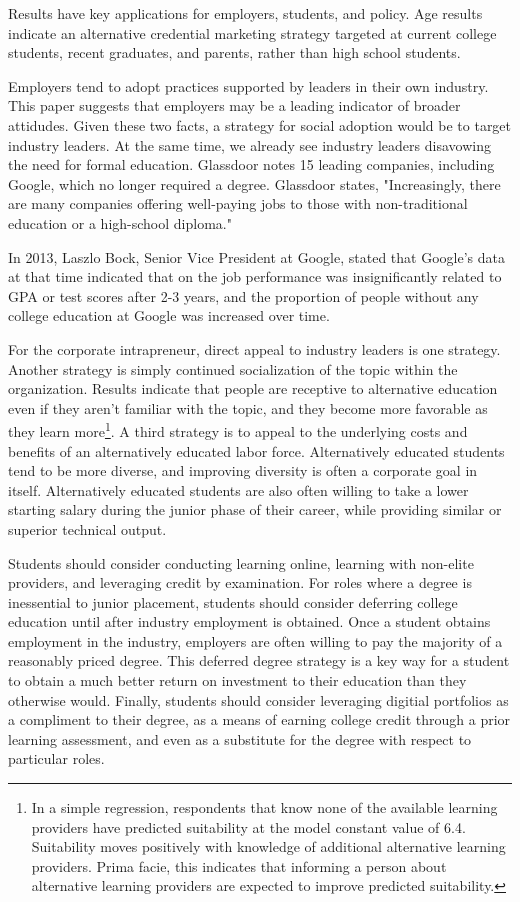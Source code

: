 \documentclass[AER]{./aea-latex-templates/AEA}
\begin{document}
Results have key applications for employers, students, and policy.
Age results indicate an alternative credential marketing strategy targeted at
current college students, recent graduates, and parents, rather than high school students.

Employers tend to adopt practices supported by leaders in their own industry.
This paper suggests that employers may be a leading indicator of broader attidudes.
Given these two facts, a strategy for social adoption would be to target industry leaders.
At the same time, we already see industry leaders disavowing the need for formal education.
Glassdoor notes 15 leading companies, including Google, which no longer required a degree\cite{glassdoor_2018}. Glassdoor
states, "Increasingly, there are many companies offering well-paying jobs
to those with non-traditional education or a high-school diploma."

In 2013, Laszlo Bock, Senior Vice President at Google, stated that Google’s data at that time indicated
that on the job performance was insignificantly related to GPA or test
scores after 2-3 years, and the proportion of people without any college
education at Google was increased over time\cite{bryant_2013}.

For the corporate intrapreneur, direct appeal to industry leaders is one strategy.
Another strategy is simply continued socialization of the topic within the organization.
Results indicate that people are receptive to alternative education even if they aren’t
familiar with the topic, and they become more favorable as they learn
more\footnote{In a simple regression, respondents that know none of the available learning providers have predicted suitability at the model constant value of 6.4.
Suitability moves positively with knowledge of additional alternative learning providers.
Prima facie, this indicates that informing a person about alternative learning providers are expected to improve predicted suitability.}.
A third strategy is to appeal to the underlying costs and benefits of an alternatively educated labor force.
Alternatively educated students tend to be more diverse\cite{florentine_2018}, and improving diversity is often a corporate goal in itself.
Alternatively educated students are also often willing to take a lower starting salary during the junior phase of their career, while providing similar or superior technical output.

Students should consider conducting learning online, learning with non-elite providers,
and leveraging credit by examination.
For roles where a degree is inessential to junior placement, students should consider
deferring college education until after industry employment is obtained.
Once a student obtains employment in the industry, employers are often willing to pay the majority of a reasonably priced degree.
This deferred degree strategy is a key way for a student to obtain a much better return on investment to their education than they otherwise would.
Finally, students should consider leveraging digitial portfolios as a compliment to their degree,
as a means of earning college credit through a prior learning assessment,
and even as a substitute for the degree with respect to particular roles.
\end{document}
